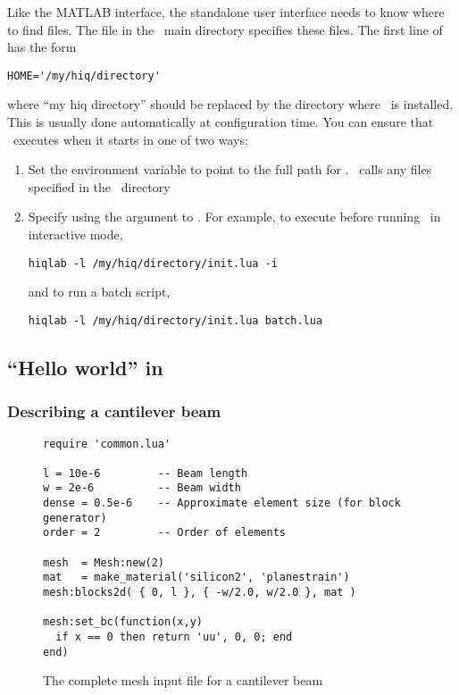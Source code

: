 Like the MATLAB interface, the standalone user interface needs to know
where to find files.  The  file in the \hiq\ main
directory specifies these files.  The first line of 
has the form
\begin{verbatim}
HOME='/my/hiq/directory'
\end{verbatim}
where ``my hiq directory'' should be replaced by the directory
where \hiq\ is installed.  This is usually done automatically at
configuration time.  You can ensure that \hiq\ executes
 when it starts in one of two ways:
\begin{enumerate}
\item Set the  environment variable to point to the
  full path for .  \hiq\ calls any files specified in
  the \hiq\ directory
\item Specify  using the  argument to
  \hiq.  For example, to execute  before running
  \hiq\ in interactive mode,
\begin{verbatim}
hiqlab -l /my/hiq/directory/init.lua -i
\end{verbatim}
  and to run a batch script,
\begin{verbatim}
hiqlab -l /my/hiq/directory/init.lua batch.lua
\end{verbatim}
\end{enumerate}


\subsection{``Hello world'' in \hiq}

\subsubsection{Describing a cantilever beam}

\begin{figure}
\begin{verbatim}
require 'common.lua'
 
l = 10e-6         -- Beam length
w = 2e-6          -- Beam width
dense = 0.5e-6    -- Approximate element size (for block generator)
order = 2         -- Order of elements
 
mesh  = Mesh:new(2)
mat   = make_material('silicon2', 'planestrain')
mesh:blocks2d( { 0, l }, { -w/2.0, w/2.0 }, mat )
 
mesh:set_bc(function(x,y)
  if x == 0 then return 'uu', 0, 0; end
end)
\end{verbatim}
\caption{The complete mesh input file for a cantilever beam}
\label{mesh-input-fig}
\end{figure}

